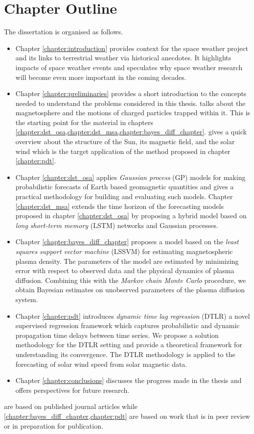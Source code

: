 \section{Chapter Outline}

The dissertation is organised as follows.

\begin{itemize}
    \item Chapter \ref{chapter:introduction} provides context for the space weather project and its 
    links to terrestrial weather via historical anecdotes. It highlights impacts of space weather events 
    and speculates why space weather research will become even more important in the coming decades.

    \item Chapter \ref{chapter:preliminaries} provides a short introduction to the concepts needed to 
    understand the problems considered in this thesis.  talks about the magnetosphere and 
    the motions of charged particles trapped within it. This is the starting point for the material in chapters 
    \cref{chapter:dst_osa,chapter:dst_msa,chapter:bayes_diff_chapter}.  gives a 
    quick overview about the structure of the Sun, its magnetic field, and the solar wind which is the target 
    application of the method proposed in chapter \ref{chapter:pdt}.
    
    \item Chapter \ref{chapter:dst_osa} applies \emph{Gaussian process} (GP) models for making probabilistic 
    forecasts of Earth based geomagnetic quantities and gives a practical methodology for building and evaluating 
    such models. Chapter \ref{chapter:dst_msa} extends the time horizon of the forecasting models proposed in 
    chapter \ref{chapter:dst_osa} by proposing a hybrid model based on \emph{long short-term memory} (LSTM) networks 
    and Gaussian processes.
    
    \item Chapter \ref{chapter:bayes_diff_chapter} proposes a model based on the 
    \emph{least squares support vector machine} (LSSVM) for estimating magnetospheric plasma density. The parameters 
    of the model are estimated by minimizing error with respect to observed data and the physical dynamics of 
    plasma diffusion. Combining this with the \emph{Markov chain Monte Carlo} procedure, we obtain Bayesian 
    estimates on unobserved parameters of the plasma diffusion system.   
    
    \item Chapter \ref{chapter:pdt} introduces \emph{dynamic time lag regression} (DTLR) a novel supervised 
    regression framework which captures probabilistic and dynamic propagation time delays between time series. 
    We propose a solution methodology for the DTLR setting and provide a theoretical framework for understanding 
    its convergence. The DTLR methodology is applied to the forecasting of solar wind speed from solar magnetic data. 
    
    \item Chapter \ref{chapter:conclusions} discusses the progress made in the thesis and offers perspectives for 
    future research.
\end{itemize}


 are based on published journal articles 
while \cref{chapter:bayes_diff_chapter,chapter:pdt} are based on work that is in peer review or in 
preparation for publication.  